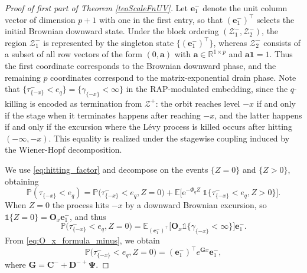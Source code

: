 \documentclass[10pt,a4paper]{amsart}
\newcommand{\PP}{\mathbb{P}}
\newcommand{\correction}[1]{{\textcolor{blue}{#1}}}
\newcommand{\e}{\mathrm{e}}
\begin{document}
\begin{proof}[Proof of first part of Theorem \ref{teoScaleFnUV}]
Let $\bm{e}_1^-$ denote the unit column vector of dimension $p+1$ with one in the first entry, so that $(\bm{e}_1^-)^\intercal$ selects the initial Brownian downward state. Under the block ordering $(\mathcal{Z}_1^-,\mathcal{Z}_2^-)$, the region $\mathcal{Z}_1^-$ is represented by the singleton state $\{(\bm{e}_1^-)^\intercal\}$, whereas $\mathcal{Z}_2^-$ consists of a subset of all row vectors of the form $(0,\bm{a})$ with $\bm{a}\in\mathbb{R}^{1\times p}$ and $\bm{a}\bm{1}=1$. Thus the first coordinate corresponds to the Brownian downward phase, and the remaining $p$ coordinates correspond to the matrix-exponential drain phase.
Note that $\{\tau^-_{\{-x\}} < e_q\} = \{\gamma_{\{-x\}} < \infty\}$ in the RAP-modulated embedding, since the $q$-killing is encoded as termination from $\mathcal{Z}^+$: the orbit reaches level $-x$ if and only if the stage when it terminates happens after reaching $-x$, and the latter happens if and only if the excursion where the L\'evy process is killed occurs after hitting $(-\infty,-x)$. 
This equality is realized under the stagewise coupling induced by the Wiener-Hopf decomposition. 


We use \eqref{eq:hitting_factor} and decompose on the events $\{Z=0\}$ and $\{Z>0\}$, obtaining
\[
\PP(\tau_{\{-x\}} < e_q) = \mathbb{P}\big(\tau^-_{\{-x\}} < e_q,Z=0\big)+\mathbb{E}\Big[\e^{-\Phi_q Z}\;\mathds{1}\big\{\tau^-_{\{-x\}} < e_q,Z>0\big\}\Big].
\]
When $Z=0$ the process hits $-x$ by a downward Brownian excursion, so $\mathds{1}\{Z=0\}=\bm O_{x}\bm{e}_1^-$, and thus
\[
\mathbb{P}\big(\tau^-_{\{-x\}} < e_q,Z=0\big)=\mathbb{E}_{(\bm{e}_1^-)^\intercal}\big[\bm O_x\mathds{1}\{\gamma_{\{-x\}}<\infty\}\big]\bm{e}_1^-.
\]
From \eqref{eq:O_x_formula_minus}, we obtain
\[
\mathbb{P}\big(\tau^-_{\{-x\}} < e_q,Z=0\big)=(\bm{e}_1^-)^\intercal e^{\bm{G}x}\bm{e}_1^-,
\]
where $\bm{G}=\bm{C}^- + \bm{D}^{-+}\bm{\Psi}$.


\end{proof}
\end{document}
